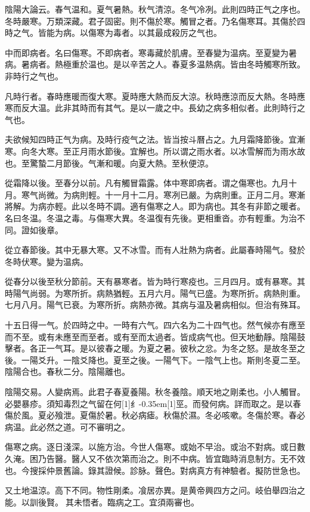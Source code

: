 \documentclass[oneside,b4paper]{ctexbook}
\begin{document}
\begin{flushleft}
陰陽大論云。春气温和。夏气暑熱。秋气清涼。冬气冷冽。此則四時正气之序也。冬時嚴寒。万類深藏。君子固密。則不傷於寒。觸冒之者。乃名傷寒耳。其傷於四時之气。皆能为病。以傷寒为毒者。以其最成殺厉之气也。

中而即病者。名曰傷寒。不即病者。寒毒藏於肌膚。至春變为温病。至夏變为暑病。暑病者。熱極重於温也。是以辛苦之人。春夏多温熱病。皆由冬時觸寒所致。非時行之气也。

凡時行者。春時應暖而復大寒。夏時應大熱而反大涼。秋時應涼而反大熱。冬時應寒而反大温。此非其時而有其气。是以一歲之中。長幼之病多相似者。此則時行之气也。

夫欲候知四時正气为病。及時行疫气之法。皆当按斗曆占之。九月霜降節後。宜漸寒。向冬大寒。至正月雨水節後。宜解也。所以谓之雨水者。以冰雪解而为雨水故也。至驚蟄二月節後。气漸和暖。向夏大熱。至秋便涼。

從霜降以後。至春分以前。凡有觸冒霜露。体中寒即病者。谓之傷寒也。九月十月。寒气尚微。为病則輕。十一月十二月。寒冽已嚴。为病則重。正月二月。寒漸將解。为病亦輕。此以冬時不調。適有傷寒之人。即为病也。其冬有非節之暖者。名曰冬温。冬温之毒。与傷寒大異。冬温復有先後。更相重沓。亦有輕重。为治不同。證如後章。

從立春節後。其中无暴大寒。又不冰雪。而有人壯熱为病者。此屬春時陽气。發於冬時伏寒。變为温病。

從春分以後至秋分節前。天有暴寒者。皆为時行寒疫也。三月四月。或有暴寒。其時陽气尚弱。为寒所折。病熱猶輕。五月六月。陽气已盛。为寒所折。病熱則重。七月八月。陽气已衰。为寒所折。病熱亦微。其病与温及暑病相似。但治有殊耳。

十五日得一气。於四時之中。一時有六气。四六名为二十四气也。然气候亦有應至而不至。或有未應至而至者。或有至而太過者。皆成病气也。但天地動靜。陰陽鼓擊者。各正一气耳。是以彼春之暖。为夏之暑。彼秋之忿。为冬之怒。是故冬至之後。一陽爻升。一陰爻降也。夏至之後。一陽气下。一陰气上也。斯則冬夏二至。陰陽合也。春秋二分。陰陽離也。

陰陽交易。人變病焉。此君子春夏養陽。秋冬養陰。順天地之剛柔也。小人觸冒。必嬰暴疹。須知毒烈之气留在何{\hbox{\scalebox{0.68}[1]{纟}\kern-0.35em\scalebox{0.64}[1]{巠}}}。而發何病。詳而取之。是以春傷於風。夏必飱泄。夏傷於暑。秋必病瘧。秋傷於濕。冬必咳嗽。冬傷於寒。春必病温。此必然之道。可不審明之。

傷寒之病。逐日淺深。以施方治。今世人傷寒。或始不早治。或治不對病。或日數久淹。困乃告醫。醫人又不依次第而治之。則不中病。皆宜臨時消息制方。无不效也。今搜採仲景舊論。錄其證候。診脉。聲色。對病真方有神驗者。擬防世急也。

又土地温涼。高下不同。物性剛柔。飡居亦異。是黄帝興四方之问。岐伯舉四治之能。以訓後賢。{𫔭}其未悟者。臨病之工。宜須兩審也。


\end{flushleft}
\end{document}
